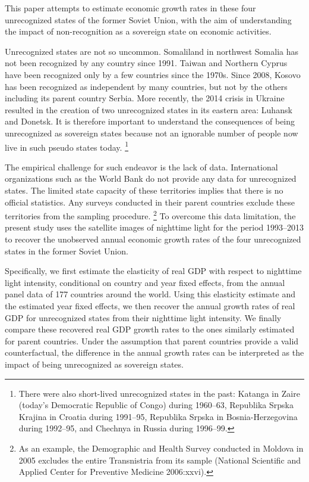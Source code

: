 \documentclass[12pt,a4paper]{article}%
\begin{document}
This paper attempts to estimate economic growth rates in these four unrecognized states of the former Soviet Union, with the aim of understanding the impact of non-recognition as a sovereign state on economic activities. 

Unrecognized states are not so uncommon. 
Somaliland in northwest Somalia has not been recognized by any country since 1991. 
Taiwan and Northern Cyprus have been recognized only by a few countries since the 1970s. 
Since 2008, Kosovo has been recognized as independent by many countries, but not by the others including its parent country Serbia.
More recently, the 2014 crisis in Ukraine resulted in the creation of two unrecognized states in its eastern area: Luhansk and Donetsk.
It is therefore important to understand the consequences of being unrecognized as sovereign states because not an ignorable number of people now live in such pseudo states today.%
\footnote{
	There were also short-lived unrecognized states in the past: Katanga in Zaire (today's Democratic Republic of Congo) during 1960--63, Republika Srpska Krajina in Croatia during 1991--95, Republika Srpska in Bosnia-Herzegovina during 1992--95, and Chechnya in Russia during 1996--99.
	}

The empirical challenge for such endeavor is the lack of data. International organizations such as the World Bank do not provide any data for unrecognized states. 
The limited state capacity of these territories implies that there is no official statistics. 
Any surveys conducted in their parent countries exclude these territories from the sampling procedure.%
\footnote{%
	As an example, the Demographic and Health Survey conducted in Moldova in 2005 excludes the entire Transnistria from its sample (National Scientific and Applied Center for Preventive Medicine 2006:xxvi).
} 
To overcome this data limitation, the present study uses the satellite images of nighttime light for the period 1993--2013 to recover the unobserved annual economic growth rates of the four unrecognized states in the former Soviet Union.

Specifically, we first estimate the elasticity of real GDP with respect to nighttime light intensity, conditional on country and year fixed effects, from the annual panel data of 177 countries around the world. 
Using this elasticity estimate and the estimated year fixed effects, we then recover the annual growth rates of real GDP for unrecognized states from their nighttime light intensity. 
We finally compare these recovered real GDP growth rates to the ones similarly estimated for parent countries. 
Under the assumption that parent countries provide a valid counterfactual, the difference in the annual growth rates can be interpreted as the impact of being unrecognized as sovereign states. 
\end{document}
